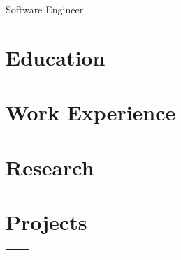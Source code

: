 \documentclass{cv}
\begin{document}
        {Software Engineer}

    \vspace*{-0.15cm}

    \section{Education}
        
    
    \vspace*{-0.1cm}

    \section{Work Experience}
        
        

    \section{Research}
        
        

    \section{Projects}
        \begin{tabular}{p{0.488\linewidth}p{0.488\linewidth}}
            
            

            &

            
            
        \end{tabular}
        
\end{document}

